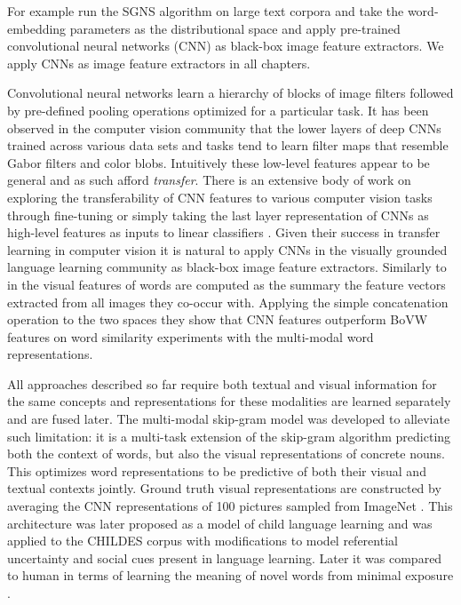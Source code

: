 For example \cite{kiela2014learning} run the SGNS algorithm
on large text corpora and take the word-embedding parameters
as the distributional space and
apply pre-trained convolutional neural networks (CNN) as black-box image
feature extractors. We apply CNNs as image feature extractors in all chapters.


Convolutional neural networks learn a hierarchy of blocks of image filters followed by
pre-defined pooling operations optimized for a particular task.
It has been observed in the computer vision community that the lower layers of
deep CNNs trained across various data sets and tasks tend to learn filter maps
that resemble Gabor filters and color blobs. Intuitively these low-level features appear to be general
and as such afford \emph{transfer}. There is an extensive body of work on exploring the transferability
of CNN features to various computer vision tasks through fine-tuning
 \citep{donahue2014decaf,oquab2014learning} or simply taking the last layer representation of CNNs
as high-level features as inputs to linear classifiers \citep{girshick2014rich,sharif2014cnn}.
Given their success in transfer learning in computer vision it is natural to apply CNNs in the
visually grounded language learning community as black-box image feature extractors.
Similarly to \cite{bruni2014multimodal} in
\cite{kiela2014learning} the visual features of words are computed as the summary the feature vectors
extracted from all images they co-occur with.
Applying the simple concatenation operation to the two spaces
they show that CNN features outperform BoVW features on word similarity
experiments with the multi-modal word representations.

All approaches described so far require both textual and visual information for the same concepts and
representations for these modalities are learned separately and are fused later.
The multi-modal skip-gram \citep{lazaridou2015combining} model was developed to alleviate such limitation:
it is a multi-task extension of the skip-gram algorithm predicting both the context of words, but also
the visual representations of concrete nouns. This optimizes word representations to be predictive of
both their visual and textual contexts jointly. Ground truth visual representations are constructed by averaging
the CNN representations \citep{krizhevsky2012imagenet} of 100 pictures sampled from ImageNet \citep{deng2009imagenet}.
This architecture was later proposed as a model of child language learning and
was applied to the CHILDES corpus \cite{macwhinney2014childes} with modifications to model referential
uncertainty and social cues \citep{lazaridou2016multimodal} present in language learning.
Later it was compared to human in terms of learning the meaning of novel words from minimal 
exposure  \citep{lazaridou2017multimodal}.


